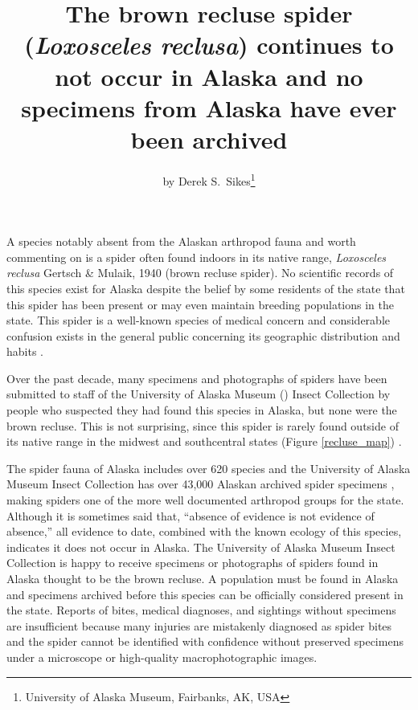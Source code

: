 \title{The brown recluse spider (\textit{Loxosceles reclusa}) continues to not occur in Alaska and no specimens from Alaska have ever been archived}

\subtitle{}

\author{by Derek S.\ Sikes\footnote{University of Alaska Museum, Fairbanks, AK, USA}}

\maketitle

A species notably absent from the Alaskan arthropod fauna and worth commenting on is a spider often found indoors in its native range, \textit{Loxosceles reclusa} Gertsch \& Mulaik, 1940  (brown recluse spider). No scientific records of this species exist for Alaska \citep{Simpsonetal2019} despite the belief by some residents of the state that this spider has been present or may even maintain breeding populations in the state. This spider is a well-known species of medical concern and considerable confusion exists in the general public concerning its geographic distribution and habits \citep{VetterBush2002}. 

Over the past decade, many specimens and photographs of spiders have been submitted to staff of the University of Alaska Museum () Insect Collection by people who suspected they had found this species in Alaska, but none were the brown recluse. This is not surprising, since this spider is rarely found outside of its native range in the midwest and southcentral  states (Figure \ref{recluse_map}) \citep{VetterBush2002, GBIF2020, iNaturalist2020}. 

The spider fauna of Alaska includes over 620 species and the University of Alaska Museum Insect Collection has over 43,000 Alaskan archived spider specimens \citep{Sikesetal2017}, making spiders one of the more well documented arthropod groups for the state. Although it is sometimes said that, ``absence of evidence is not evidence of absence,'' all evidence to date, combined with the known ecology of this species, indicates it does not occur in Alaska. The University of Alaska Museum Insect Collection is happy to receive specimens or photographs of spiders found in Alaska thought to be the brown recluse. A population must be found in Alaska and specimens archived before this species can be officially considered present in the state. Reports of bites, medical diagnoses, and sightings without specimens are insufficient because many injuries are mistakenly diagnosed as spider bites \citep{VetterBush2002} and the spider cannot be identified with confidence without preserved specimens under a microscope or high-quality macrophotographic images.


